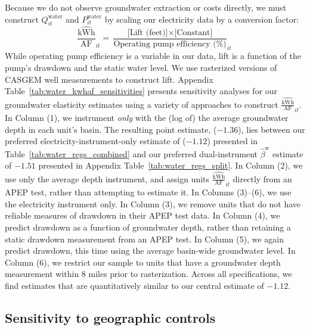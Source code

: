 Because we do not observe groundwater extraction or costs directly, we must construct $Q^{\text{water}}_{it}$ and $P^{\text{water}}_{it}$ by scaling our electricity data by a conversion factor: 
$$\widehat{\frac{\text{kWh}}{\text{AF}}}_{it} = \frac{\text{[Lift (feet)]} \times \text{[Constant]}}{\text{Operating pump efficiency (\%)}}_{it}$$
While operating pump efficiency is a variable in our data, lift is a function of the pump's drawdown and the static water level. We use rasterized versions of CASGEM well measurements to construct lift. %
Appendix Table~\ref{tab:water_kwhaf_sensitivities} presents sensitivity analyses for our groundwater elasticity estimates using a variety of approaches to construct $\widehat{\frac{\text{kWh}}{\text{AF}}}_{it}$. In Column (1), we instrument \emph{only} with the (log of) the average groundwater depth in each unit's basin. The resulting point estimate, ($-1.36$), lies between our preferred electricity-instrument-only estimate of ($-1.12$) presented in Table~\ref{tab:water_regs_combined} and our preferred dual-instrument $\hat\beta^{\text{w}}$ estimate of $-1.51$ presented in Appendix Table~\ref{tab:water_regs_split}. In Column (2), we use only the average depth instrument, and assign units $\widehat{\frac{\text{kWh}}{\text{AF}}}_{it}$ directly from an APEP test, rather than attempting to estimate it. In Columns (3)--(6), we use the electricity instrument only. In Column (3), we remove units that do not have reliable measures of drawdown in their APEP test data. In Column (4), we predict drawdown as a function of groundwater depth, rather than retaining a static drawdown measurement from an APEP test. In Column (5), we again predict drawdown, this time using the average basin-wide groundwater level. In Column (6), we restrict our sample to units that have a groundwater depth measurement within 8 miles prior to rasterization. Across all specifications, we find estimates that are quantitatively similar to our central estimate of $-1.12$.  



\FloatBarrier
\subsection{Sensitivity to geographic controls}
\label{app:sens_geographic_controls}

